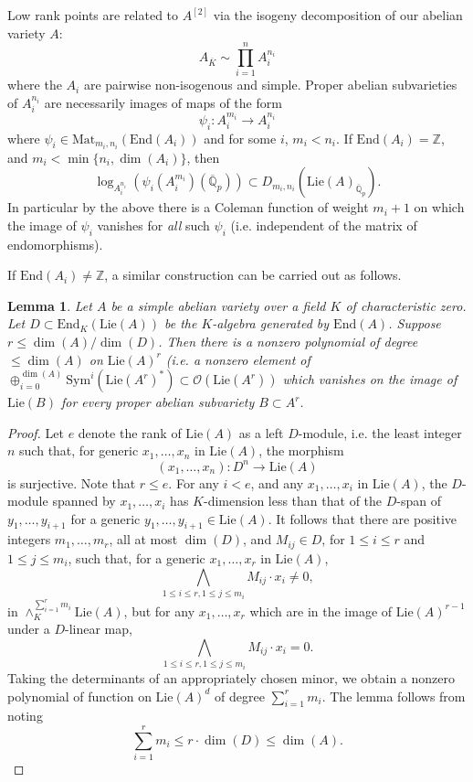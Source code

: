 \documentclass[11pt]{amsart}
\def\Z{\mathbb Z}
\def\Q{\mathbb Q}
\newcommand{\Sym}{\mathrm{Sym}}
\newcommand{\Lie}{\mathrm{Lie}}
\newcommand{\End}{\mathrm{End}}
\theoremstyle{plain}
\newtheorem{lemma}{Lemma}
\theoremstyle{definition}
\newcommand{\Mat}{\mathrm{Mat}}
\begin{document}
Low rank points are related to $A^{[2]}$ via the isogeny decomposition of our abelian variety $A$:
\[
A_{\overline{K}} \sim \prod _{i=1}^n A_i ^{n_i}
\]
where the $A_i $ are pairwise non-isogenous and simple. Proper abelian subvarieties of $A_i ^{n_i}$ are necessarily images of maps of the form
\[
\psi _i :A_i ^{m_i }\to A_i ^{n_i }
\]
where $\psi _i \in \Mat _{m_i ,n_i }(\End (A_i ))$ and for some $i$, $m_i <n_i $. If $\End (A_i )=\Z $, and $m_i <\min \{ n_i ,\dim (A_i ) \}$, then 
\[
\log _{A_i ^{n_i }}(\psi _i (A_i ^{m_i })(\overline{\Q }_p ))\subset D_{m_i ,n_i }(\Lie (A)_{\overline{\Q }_p }).
\]
In particular by the above there is a Coleman function of weight $m_i +1$ on which the image of $\psi _i $ vanishes for \textit{all} such $\psi _i $ (i.e. independent of the matrix of endomorphisms).

If $\End (A_i )\neq \Z $, a similar construction can be carried out as follows.
\begin{lemma}\label{lemma:pol1}
Let $A$ be a simple abelian variety over a field $K$ of characteristic zero. Let $D\subset \End _K (\Lie (A))$ be the $K$-algebra generated by $\End (A)$. Suppose $r\leq \dim (A)/\dim (D)$. Then there is a nonzero polynomial of degree $\leq \dim (A)$ on $\Lie (A)^r$ (i.e. a nonzero element of $\oplus _{i=0}^{\dim (A)}\Sym ^i (\Lie (A^r)^* )\subset \mathcal{O}(\Lie (A^r))$ which vanishes on the image of $\Lie (B)$ for every proper abelian subvariety $B\subset A^r$.
\end{lemma}
\begin{proof}
Let $e$ denote the rank of $\Lie (A)$ as a left $D$-module, i.e. the least integer $n$ such that, for generic $x_1 ,\ldots ,x_n$ in $\Lie (A)$, the morphism
\[
(x_1 ,\ldots ,x_n ):D^n \to \Lie (A)
\]
is surjective. Note that $r\leq e$. For any $i<e$, and any $x_1 ,\ldots ,x_i$ in $\Lie (A)$, the $D$-module spanned by $x_1 ,\ldots ,x_i$ has $K$-dimension less than that of the $D$-span of $y_1 ,\ldots ,y_{i+1}$ for a generic $y_1 ,\ldots ,y_{i+1}\in \Lie (A)$. It follows that there are positive integers $m_1 ,\ldots ,m_r $, all at most $\dim (D)$, and $M_{ij}\in D$, for $1\leq i\leq r$ and $1\leq j\leq m_i$, such that, for a generic $x_1 ,\ldots ,x_r$ in $\Lie (A)$,
\[
\bigwedge _{1\leq i\leq r,1\leq j\leq m_i }M_{ij}\cdot x_i \neq 0,
\]
in $\wedge _K ^{\sum _{i=1}^r m_i }\Lie (A)$, but for any $x_1 ,\ldots ,x_r $ which are in the image of $\Lie (A)^{r-1}$ under a $D$-linear map,
\[
\bigwedge _{1\leq i\leq r,1\leq j\leq m_i }M_{ij}\cdot x_i =0.
\]
Taking the determinants of an appropriately chosen minor, we obtain a nonzero polynomial of function on $\Lie (A)^d$ of degree $\sum _{i=1}^r m_i$. The lemma follows from noting
\[
\sum _{i=1}^r m_i \leq r\cdot \dim (D)\leq \dim (A).
\]
\end{proof}
\end{document}
